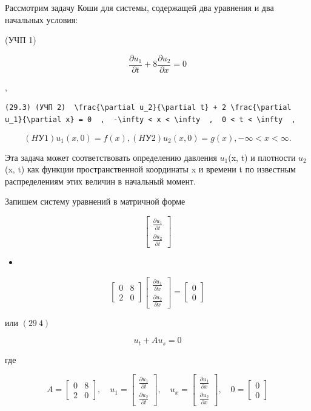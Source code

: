 \documentclass[
  ukrainian,
]{article}
\providecommand{\tightlist}{%
  \setlength{\itemsep}{0pt}\setlength{\parskip}{0pt}}
\begin{document}
Рассмотрим задачу Коши для системы, содержащей два уравнения и два
начальных условия:

(УЧП 1)

\[
\frac{\partial u_1}{\partial t} + 8 \frac{\partial u_2}{\partial x} = 0
\]

,

\begin{verbatim}
(29.3) (УЧП 2)  \frac{\partial u_2}{\partial t} + 2 \frac{\partial u_1}{\partial x} = 0  ,  -\infty < x < \infty  ,  0 < t < \infty  ,
\end{verbatim}

\[
(HУ 1)  u_1(x, 0) = f(x)  ,
(HУ 2)  u_2(x, 0) = g(x)  ,  -\infty < x < \infty  .
\]

Эта задача может соответствовать определению давления \(u_1\)(x, t) и
плотности \(u_2\)(x, t) как функции пространственной координаты x и
времени t по известным распределениям этих величин в начальный момент.

Запишем систему уравнений в матричной форме

\[
\begin{bmatrix} \frac{\partial u_1}{\partial t} \\ \frac{\partial u_2}{\partial t} \end{bmatrix}
\]

\begin{itemize}
\tightlist
\item
\end{itemize}

\[
\begin{bmatrix} 0 & 8 \\ 2 & 0 \end{bmatrix}
\begin{bmatrix} \frac{\partial u_1}{\partial x} \\ \frac{\partial u_2}{\partial x} \end{bmatrix}
=
\begin{bmatrix} 0 \\ 0 \end{bmatrix}
\]

или \((29 \ 4)\)

\[
u_t + Au_s = 0
\]

где

\[
A =
\begin{bmatrix} 0 & 8 \\ 2 & 0 \end{bmatrix}
, \quad u_1 =
\begin{bmatrix} \frac{\partial u_1}{\partial t} \\ \frac{\partial u_2}{\partial t} \end{bmatrix}
, \quad u_x =
\begin{bmatrix} \frac{\partial u_1}{\partial x} \\ \frac{\partial u_2}{\partial x} \end{bmatrix}
, \quad 0 =
\begin{bmatrix} 0 \\ 0 \end{bmatrix}
\]
\end{document}
